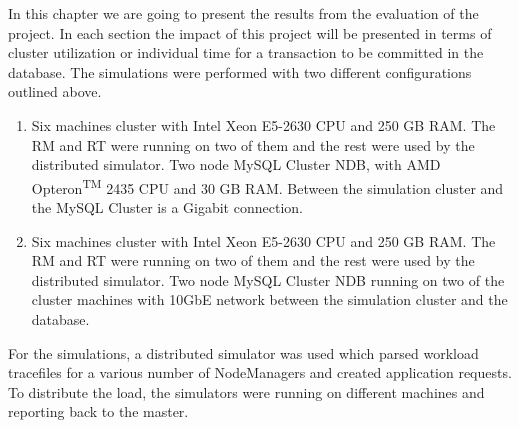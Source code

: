 In this chapter we are going to present the results from the evaluation
of the project. In each section the impact of this project will be
presented in terms of cluster utilization or individual time
for a transaction to be committed in the database. The simulations were
performed with two different configurations outlined above.

\begin{enumerate}
\item Six machines cluster with Intel\textsuperscript{\textregistered}
  Xeon \textsuperscript{\textregistered} E5-2630 CPU and 250 GB
  RAM. The RM and RT were running on two of them and the rest were
  used by the distributed simulator. Two node MySQL Cluster NDB, with
  AMD Opteron\textsuperscript{TM} 2435 CPU and 30 GB RAM. Between the
  simulation cluster and the MySQL Cluster is a Gigabit connection.

\item Six machines cluster with Intel\textsuperscript{\textregistered}
  Xeon \textsuperscript{\textregistered} E5-2630 CPU and 250 GB
  RAM. The RM and RT were running on two of them and the rest were
  used by the distributed simulator. Two node MySQL Cluster NDB
  running on two of the cluster machines with 10GbE network between
  the simulation cluster and the database.

\end{enumerate}

For the simulations, a distributed simulator was used which parsed
workload tracefiles for a various number of NodeManagers and created
application requests. To distribute the load, the simulators were
running on different machines and reporting back to the master.